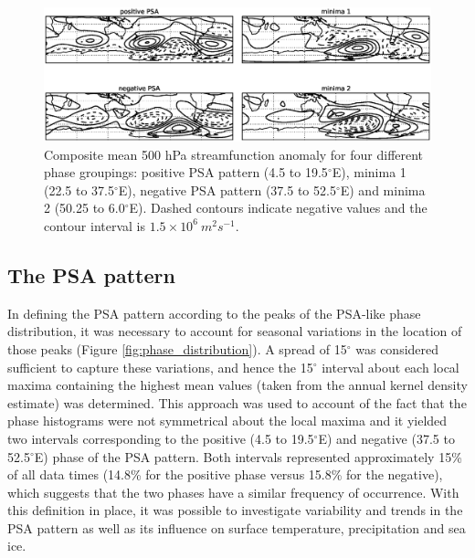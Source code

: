 \begin{figure}
\begin{center}
\includegraphics[width=1\columnwidth]{figures/psa/Figure4-6.eps}
\caption[Composite mean 500 hPa streamfunction anomaly for various phase groupings]{\label{fig:sf_composites}
Composite mean 500 hPa streamfunction anomaly for four different phase groupings: positive PSA pattern (4.5 to 19.5$^{\circ}$E), minima 1 (22.5 to 37.5$^{\circ}$E), negative PSA pattern (37.5 to 52.5$^{\circ}$E) and minima 2 (50.25 to 6.0$^{\circ}$E). Dashed contours indicate negative values and the contour interval is $1.5 \times 10^6 \: m^2 s^{-1}$.%
}
\end{center}
\end{figure}


\subsection{The PSA pattern}\label{s:psa_results}

In defining the PSA pattern according to the peaks of the PSA-like phase distribution, it was necessary to account for seasonal variations in the location of those peaks (Figure \ref{fig:phase_distribution}). A spread of 15$^{\circ}$ was considered sufficient to capture these variations, and hence the 15$^{\circ}$ interval about each local maxima containing the highest mean values (taken from the annual kernel density estimate) was determined. This approach was used to account of the fact that the phase histograms were not symmetrical about the local maxima and it yielded two intervals corresponding to the positive (4.5 to 19.5$^{\circ}$E) and negative (37.5 to 52.5$^{\circ}$E) phase of the PSA pattern. Both intervals represented approximately 15\% of all data times (14.8\% for the positive phase versus 15.8\% for the negative), which suggests that the two phases have a similar frequency of occurrence. With this definition in place, it was possible to investigate variability and trends in the PSA pattern as well as its influence on surface temperature, precipitation and sea ice. 

